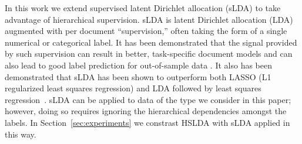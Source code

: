 In this work we extend supervised latent Dirichlet allocation (sLDA)
\cite{BleiMcAuliffe2008} to take advantage of hierarchical supervision. sLDA
is latent Dirichlet allocation (LDA) \cite{Blei2003} augmented with per
document ``supervision,'' often taking the form of a single numerical or
categorical label. It has been demonstrated that the signal provided by such
supervision can result in better, task-specific document models and can also
lead to good label prediction for out-of-sample data \cite{BleiMcAuliffe2008}.
It also has been demonstrated that sLDA has been shown to outperform both LASSO
(L1 regularized least squares regression) and LDA followed by least squares
regression~\cite{BleiMcAuliffe2008}. sLDA can be applied to data of the type
we consider in this paper; however, doing so requires ignoring the hierarchical
dependencies amongst the labels. In Section~\ref{sec:experiments} we constrast
HSLDA with sLDA applied in this way. 




